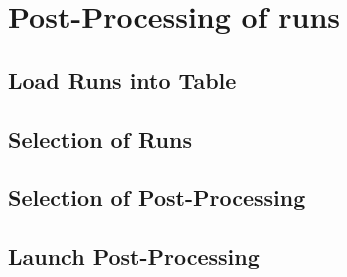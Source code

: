 \section{Post-Processing of runs}
\subsection{Load Runs into Table}
\subsection{Selection of Runs}
\subsection{Selection of Post-Processing}
\subsection{Launch Post-Processing}

